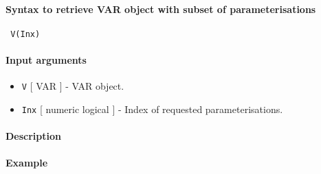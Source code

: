 


	\paragraph{Syntax to retrieve VAR object with subset of
 parameterisations}
 
 \begin{verbatim}
 V(Inx)
 \end{verbatim}
 
 \paragraph{Input arguments}
 
 \begin{itemize}
 \item
   \texttt{V} {[} VAR {]} - VAR object.
 \item
   \texttt{Inx} {[} numeric \textbar{} logical {]} - Index of requested
   parameterisations.
 \end{itemize}
 
 \paragraph{Description}
 
 \paragraph{Example}


